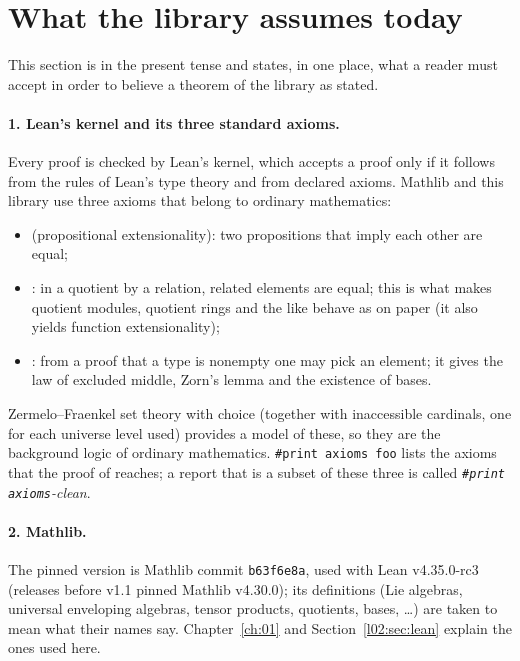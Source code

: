 \section{What the library assumes today}\label{l02:sec:assumes}

This section is in the present tense and states, in one place, what a reader must accept in order to
believe a theorem of the library as stated.

\paragraph{1. Lean's kernel and its three standard axioms.} Every proof is checked by Lean's kernel,
which accepts a proof only if it follows from the rules of Lean's type theory and from declared
axioms. Mathlib and this library use three axioms that belong to ordinary mathematics:
\begin{itemize}
\item {} (propositional extensionality): two propositions that imply each other are equal;
\item {}: in a quotient by a relation, related elements are equal; this is what makes
  quotient modules, quotient rings and the like behave as on paper (it also yields function
  extensionality);
\item {}: from a proof that a type is nonempty one may pick an element; it gives the
  law of excluded middle, Zorn's lemma and the existence of bases.
\end{itemize}
Zermelo--Fraenkel set theory with choice (together with inaccessible cardinals, one for each universe
level used) provides a model of these, so they are the background logic of ordinary mathematics.
\texttt{\#print axioms foo} lists the axioms that the proof of  reaches; a report that is a
subset of these three is called \emph{\texttt{\#print axioms}-clean}.

\paragraph{2. Mathlib.} The pinned version is Mathlib commit \texttt{b63f6e8a}, used with Lean v4.35.0-rc3 (releases
before v1.1 pinned Mathlib v4.30.0); its definitions (Lie algebras,
universal enveloping algebras, tensor products, quotients, bases, \ldots) are taken to mean what their
names say. Chapter~\ref{ch:01} and Section~\ref{l02:sec:lean} explain the ones used here.

